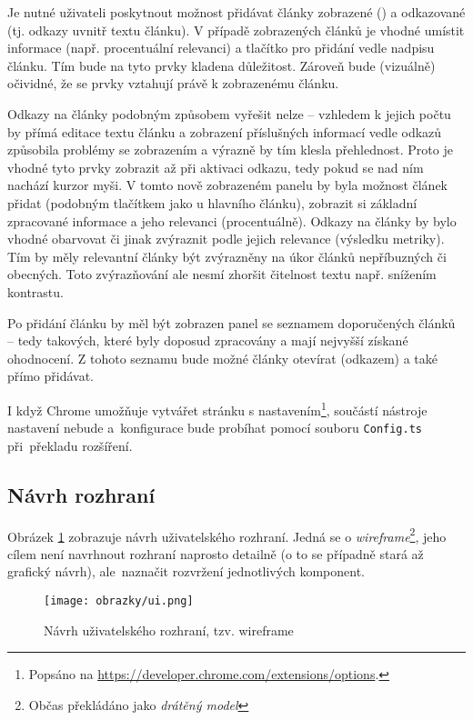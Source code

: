 Je nutné uživateli poskytnout možnost přidávat články zobrazené () a odkazované (tj. odkazy uvnitř textu článku). V případě zobrazených článků je vhodné umístit informace (např. procentuální relevanci) a tlačítko pro přidání vedle nadpisu článku. Tím bude na tyto prvky kladena důležitost. Zároveň bude (vizuálně) očividné, že se prvky vztahují právě k zobrazenému článku.

Odkazy na články podobným způsobem vyřešit nelze -- vzhledem k jejich počtu by přímá editace textu článku a zobrazení příslušných informací vedle odkazů způsobila problémy se zobrazením a výrazně by tím klesla přehlednost. Proto je vhodné tyto prvky zobrazit až při aktivaci odkazu, tedy pokud se nad ním nachází kurzor myši. V tomto nově zobrazeném panelu by byla možnost článek přidat (podobným tlačítkem jako u hlavního článku), zobrazit si základní zpracované informace a jeho relevanci (procentuálně). Odkazy na články by bylo vhodné obarvovat či jinak zvýraznit podle jejich relevance (výsledku metriky). Tím by měly relevantní články být zvýrazněny na úkor článků nepříbuzných či obecných. Toto zvýrazňování ale nesmí zhoršit čitelnost textu např. snížením kontrastu.

Po přidání článku by měl být zobrazen panel se seznamem doporučených článků -- tedy takových, které byly doposud zpracovány a mají nejvyšší získané ohodnocení. Z tohoto seznamu bude možné články otevírat (odkazem) a také přímo přidávat.

I když Chrome umožňuje vytvářet stránku s nastavením\footnote{Popsáno na \url{https://developer.chrome.com/extensions/options}.}, součástí nástroje nastavení nebude a~konfigurace bude probíhat pomocí souboru \texttt{Config.ts} při~překladu rozšíření.

\subsection{Návrh rozhraní}
Obrázek \ref{obrWireframe} zobrazuje návrh uživatelského rozhraní. Jedná se o \textit{wireframe}\footnote{Občas překládáno jako \textit{drátěný model}}, jeho cílem není navrhnout rozhraní naprosto detailně (o to se případně stará až grafický návrh), ale~naznačit rozvržení jednotlivých komponent.

\begin{figure}[h]
	\centering
	\texttt{[image: obrazky/ui.png]}
	\caption{Návrh uživatelského rozhraní, tzv. wireframe}
	\label{obrWireframe}
\end{figure}

